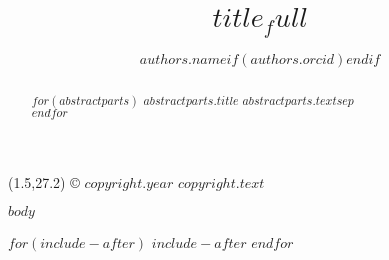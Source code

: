 \documentclass[twoside]{jchs}
\title{$title_full$}
\author[$authors.affiliation_ids$$if(authors.corresponding)$*$endif$]{$authors.name$$if(authors.orcid)$\orcidaffil{$authors.orcid$}$endif$}
\affil[$affiliations.id$]{$affiliations.address$}
\begin{document}
\enlargethispage{-2\baselineskip}


\begin{abstract}
$for(abstractparts)$
{\bfseries $abstractparts.title$} $abstractparts.text$$sep$\\
$endfor$\\
\end{abstract}


\maketitle
\thispagestyle{empty} %


\setlength{\TPHorizModule}{10mm}
\setlength{\TPVertModule}{\TPHorizModule}
\textblockorigin{0mm}{0mm}

\begin{textblock}{18}(1.5,27.2)
\footnotesize{© $copyright.year$ $copyright.text$}
\end{textblock}







\begin{multicols}{2}
$body$
\end{multicols}

$for(include-after)$
$include-after$
$endfor$



%
% 
\end{document}
